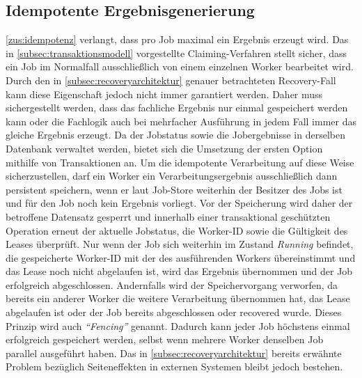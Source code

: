 \subsection{Idempotente Ergebnisgenerierung}
\label{subsec:idempotenteErgebnisgenerierung}
\ref{zus:idempotenz} verlangt, dass pro Job maximal ein Ergebnis erzeugt wird.
Das in \cref{subsec:transaktionsmodell} vorgestellte Claiming-Verfahren stellt sicher, dass ein Job im Normalfall
ausschließlich von einem einzelnen Worker bearbeitet wird.
Durch den in \cref{subsec:recoveryarchitektur} genauer betrachteten Recovery-Fall kann diese Eigenschaft jedoch nicht immer garantiert werden.
Daher muss sichergestellt werden, dass das fachliche Ergebnis nur einmal gespeichert werden kann oder die Fachlogik auch bei
mehrfacher Ausführung in jedem Fall immer das gleiche Ergebnis erzeugt.
Da der Jobstatus sowie die Jobergebnisse in derselben Datenbank verwaltet werden, bietet sich die Umsetzung der ersten
Option mithilfe von Transaktionen an.
Um die idempotente Verarbeitung auf diese Weise sicherzustellen, darf ein Worker ein Verarbeitungsergebnis ausschließlich
dann persistent speichern, wenn er laut Job-Store weiterhin der Besitzer des Jobs ist und für den Job noch kein Ergebnis vorliegt.
Vor der Speicherung wird daher der betroffene Datensatz gesperrt und innerhalb einer transaktional geschützten Operation
erneut der aktuelle Jobstatus, die Worker-ID sowie die Gültigkeit des Leases überprüft.
Nur wenn der Job sich weiterhin im Zustand \textit{Running} befindet, die gespeicherte Worker-ID mit der des ausführenden Workers
übereinstimmt und das Lease noch nicht abgelaufen ist, wird das Ergebnis übernommen und der Job erfolgreich abgeschlossen.
Andernfalls wird der Speichervorgang verworfen, da bereits ein anderer Worker die weitere Verarbeitung übernommen hat, das
Lease abgelaufen ist oder der Job bereits abgeschlossen oder recovered wurde.
Dieses Prinzip wird auch \textit{\enquote{Fencing}} \parencite[Kap.~8 Abschnitt \glqq Fencing tokens\grqq]{kleppmann_designing_2017} genannt.
Dadurch kann jeder Job höchstens einmal erfolgreich gespeichert werden, selbst wenn mehrere Worker denselben Job parallel ausgeführt haben.
Das in \cref{subsec:recoveryarchitektur} bereits erwähnte Problem bezüglich Seiteneffekten in externen Systemen bleibt jedoch bestehen.


